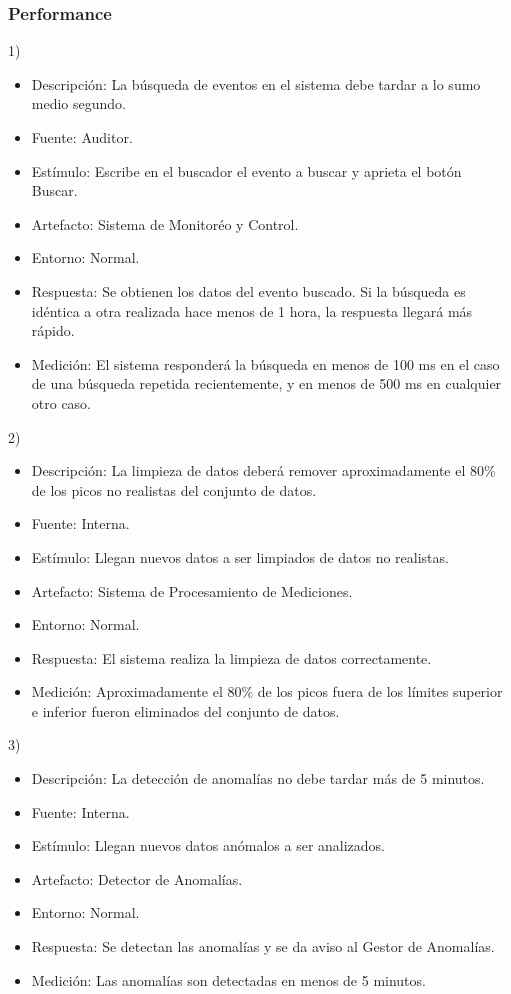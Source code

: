 \documentclass{article}
\theoremstyle{definition}
\theoremstyle{remark}
\begin{document}
\subsubsection{Performance}

1)
\begin{itemize}
  \item Descripción: La búsqueda de eventos en el sistema debe tardar a lo sumo medio segundo.
  \item Fuente: Auditor.
  \item Estímulo: Escribe en el buscador el evento a buscar y aprieta el botón Buscar.
  \item Artefacto: Sistema de Monitoréo y Control.
  \item Entorno: Normal.
  \item Respuesta: Se obtienen los datos del evento buscado. Si la búsqueda es idéntica a otra realizada hace menos de 1 hora, la respuesta llegará más rápido.
  \item Medición: El sistema responderá la búsqueda en menos de 100 ms en el caso de una búsqueda repetida recientemente, y en menos de 500 ms en cualquier otro caso.
\end{itemize}

2)
\begin{itemize}
  \item Descripción: La limpieza de datos deberá remover aproximadamente el 80\% de los picos no realistas del conjunto de datos.
  \item Fuente: Interna. %
  \item Estímulo: Llegan nuevos datos a ser limpiados de datos no realistas. %
  \item Artefacto: Sistema de Procesamiento de Mediciones. %
  \item Entorno: Normal.
  \item Respuesta: El sistema realiza la limpieza de datos correctamente.
  \item Medición: Aproximadamente el 80\% de los picos fuera de los límites superior e inferior fueron eliminados del conjunto de datos.
\end{itemize}

3)
\begin{itemize}
  \item Descripción: La detección de anomalías no debe tardar más de 5 minutos.
  \item Fuente: Interna.
  \item Estímulo: Llegan nuevos datos anómalos a ser analizados.
  \item Artefacto: Detector de Anomalías.
  \item Entorno: Normal.
  \item Respuesta: Se detectan las anomalías y se da aviso al Gestor de Anomalías.
  \item Medición: Las anomalías son detectadas en menos de 5 minutos.
\end{itemize}
\end{document}
